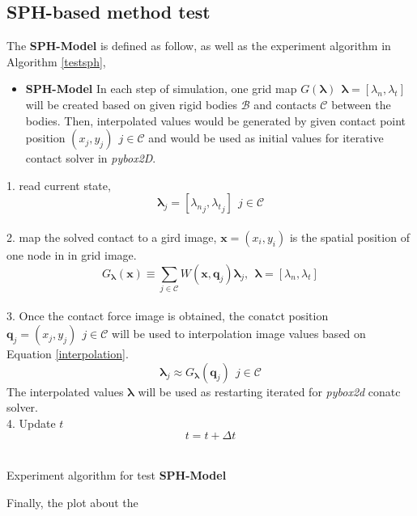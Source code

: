 \subsection{SPH-based method test}
    \label{sphtest}
    The \textbf{SPH-Model} is defined as follow, as well as the experiment algorithm in Algorithm \ref{testsph},
    \begin{itemize}
         \item \textbf{SPH-Model} In each step of simulation, one grid map $G(\mathbf{\pmb{\lambda}})~~\pmb{\lambda} = [\lambda_n, \lambda_t]$ will be created based on given rigid bodies $\mathcal{B}$ and contacts $\mathcal{C}$ between the bodies. Then, interpolated values would be generated by given contact point position $(x_j, y_j)~~j \in \mathcal{C}$ and would be used as initial values for iterative contact solver in \textit{pybox2D}. 
    \end{itemize}
    \begin{algorithm}[!h]
        {
            1. read current state,
                $$\pmb{\lambda}_{j}=[{\lambda_{n}}_{j}, {\lambda_{t}}_{j}]~~j\in\mathcal{C}$$ \\
            2. map the solved contact to a gird image, $\mathbf{x}=(x_i, y_i)$ is the spatial position of one node in in grid image.
                $$G_{\pmb{\lambda}}(\mathbf{x}) \equiv \sum_{j \in \mathcal{C}} W(\mathbf{x}, \pmb{q}_{j})\pmb{\lambda}_{j},~~\pmb{\lambda}=[\lambda_n, \lambda_t]$$ \\
            3. Once the contact force image is obtained,  the conatct position $\pmb{q}_{j} = (x_{j}, y_{j})~~j\in\mathcal{C}$  will be used to interpolation image values based on Equation \ref{interpolation}.
                $$\pmb{\lambda}_j \approx G_{\pmb{\lambda}}(\pmb{q}_j)~~j\in\mathcal{C}$$ 
            The interpolated values $\pmb{\lambda}$ will be used as restarting iterated for \textit{pybox2d} conatc solver. \\
            4. Update $t$
                $$t = t + \Delta t$$ \\
        }
        \caption{Experiment algorithm for test \textbf{SPH-Model}}
        \label{testsph}
    \end{algorithm}
    Finally, the plot about the 
